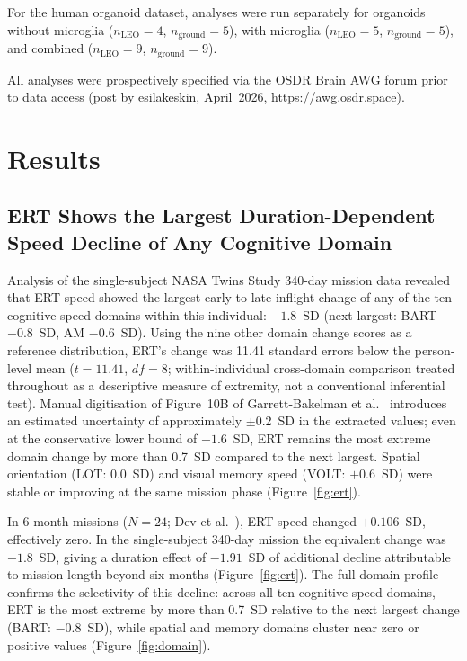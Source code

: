 \documentclass[11pt]{article}
\begin{document}
For the human organoid dataset, analyses were run separately for organoids
without microglia ($n_{\text{LEO}}=4$, $n_{\text{ground}}=5$), with
microglia ($n_{\text{LEO}}=5$, $n_{\text{ground}}=5$), and combined
($n_{\text{LEO}}=9$, $n_{\text{ground}}=9$).

All analyses were prospectively specified via the OSDR Brain AWG forum
prior to data access (post by esilakeskin, April~2026,
\url{https://awg.osdr.space}).

\section{Results}

\subsection{ERT Shows the Largest Duration-Dependent Speed Decline
of Any Cognitive Domain}

Analysis of the single-subject NASA Twins Study 340-day mission data
revealed that ERT speed showed the largest early-to-late inflight change of
any of the ten cognitive speed domains within this individual: $-1.8$~SD
(next largest: BART $-0.8$~SD, AM $-0.6$~SD).
Using the nine other domain change scores as a reference distribution, ERT's
change was 11.41 standard errors below the person-level mean ($t=11.41$,
$df=8$; within-individual cross-domain comparison treated throughout as a
descriptive measure of extremity, not a conventional inferential test).
Manual digitisation of Figure~10B of Garrett-Bakelman et al.\
\cite{garrett2019} introduces an estimated uncertainty of approximately
$\pm$0.2~SD in the extracted values; even at the conservative lower bound
of $-1.6$~SD, ERT remains the most extreme domain change by more than
0.7~SD compared to the next largest.
Spatial orientation (LOT: $0.0$~SD) and visual memory speed
(VOLT: $+0.6$~SD) were stable or improving at the same mission phase
(Figure~\ref{fig:ert}).

In 6-month missions ($N=24$; Dev et al.~\cite{dev2024}), ERT speed
changed $+0.106$~SD, effectively zero.
In the single-subject 340-day mission the equivalent change was $-1.8$~SD,
giving a duration effect of $-1.91$~SD of additional decline attributable
to mission length beyond six months (Figure~\ref{fig:ert}).
The full domain profile confirms the selectivity of this decline: across
all ten cognitive speed domains, ERT is the most extreme by more than
0.7~SD relative to the next largest change (BART: $-0.8$~SD), while
spatial and memory domains cluster near zero or positive values
(Figure~\ref{fig:domain}).
\end{document}
